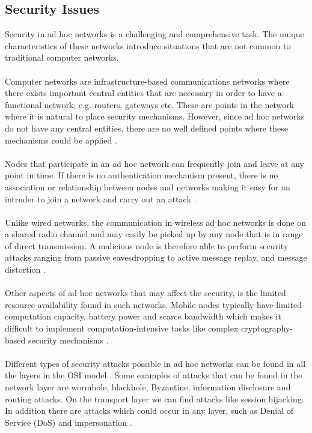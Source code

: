 \subsection{Security Issues}
\label{adhoc_security}
Security in ad hoc networks is a challenging and comprehensive task. The unique characteristics of these networks introduce situations that are not common to traditional computer networks. 
\\\\
Computer networks are infrastructure-based communications networks where there exists important central entities that are necessary in order to have a functional network, e.g. routers, gateways etc. These are points in the network where it is natural to place security mechanisms. However, since ad hoc networks do not have any central entities, there are no well defined points where these mechanisms could be applied \cite{murthy-ad}.
\\\\
Nodes that participate in an ad hoc network can frequently join and leave at any point in time. If there is no authentication mechanism present, there is no association or relationship between nodes and networks making it easy for an intruder to join a network and carry out an attack \cite{murthy-ad}.
\\\\
Unlike wired networks, the communication in wireless ad hoc networks is done on a shared radio channel and may easily be picked up by any node that is in range of direct transmission. A malicious node is therefore able to perform security attacks ranging from passive eavesdropping to active message replay, and message distortion \cite{806983}.
\\\\
Other aspects of ad hoc networks that may affect the security, is the limited resource availability found in such networks. Mobile nodes typically have limited computation capacity, battery power and scarce bandwidth which makes it difficult to implement computation-intensive tasks like complex cryptography-based security mechanisms \cite{1269716}.
\\\\
Different types of security attacks possible in ad hoc networks can be found in all the layers in the OSI model \cite{kurosecomputer}. Some examples of attacks that can be found in the network layer are wormhole, blackhole, Byzantine, information disclosure and routing attacks. On the transport layer we can find attacks like session hijacking. In addition there are attacks which could occur in any layer, such as Denial of Service (DoS) and impersonation \cite{murthy-ad}.

